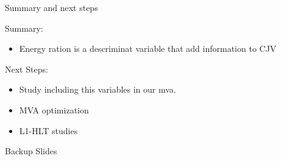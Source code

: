 \documentclass[8pt]{beamer}
\begin{document}
\begin{frame}{Summary and next steps}
 
\begin{block}{Summary:}
 
\begin{itemize}
  \item Energy ration is a descriminat variable that add information to CJV
\end{itemize}

\end{block}

\begin{block}{Next Steps:}
 
\begin{itemize}
  \item Study including this variables in our mva.
  \item MVA optimization
  \item L1-HLT studies
\end{itemize}
 
\end{block}

\end{frame}


\appendix
\begin{frame}
 
\begin{block}

\begin{center}Backup Slides\end{center}

\end{block}

\end{frame}

% 
\end{document}
